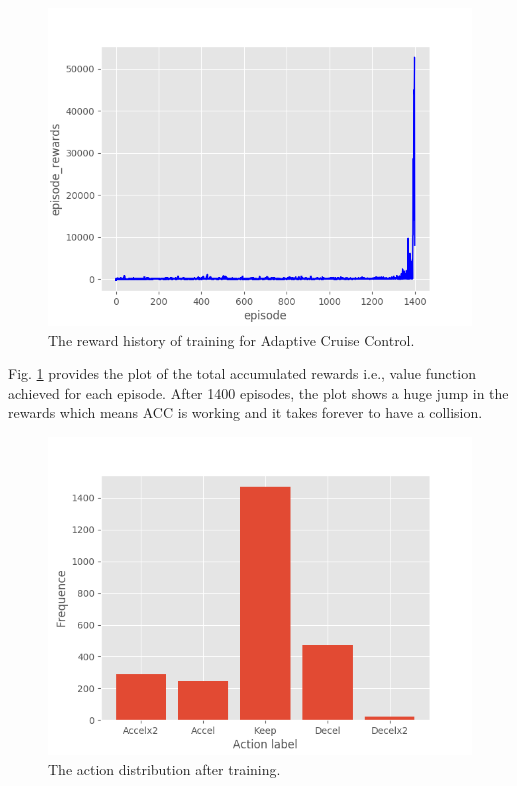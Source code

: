\begin{figure}[h]
\centering
\includegraphics[width=1.0\textwidth]{figs/ch5/acc-reward}
\caption{The reward history of training for Adaptive Cruise Control.}
\label{fig:acc-reward}
\end{figure}

Fig. \ref{fig:acc-reward} provides the plot of the total accumulated rewards i.e., value function achieved for each episode. After 1400 episodes, the plot shows a huge jump in the rewards which means ACC is working and it takes forever to have a collision.

\begin{figure}[h]
\centering
\includegraphics[width=1.0\textwidth]{figs/ch5/acc_action_distribution}
\caption{The action distribution after training.}
\label{fig:acc-action}
\end{figure}

